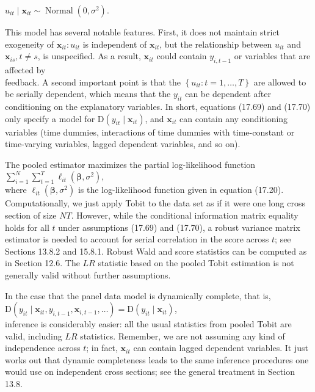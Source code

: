 \documentclass[10pt]{article}
\begin{document}
$u_{i t} \mid \mathbf{x}_{i t} \sim \operatorname{Normal}\left(0, \sigma^{2}\right)$.

This model has several notable features. First, it does not maintain strict exogeneity of $\mathbf{x}_{i t}: u_{i t}$ is independent of $\mathbf{x}_{i t}$, but the relationship between $u_{i t}$ and $\mathbf{x}_{i s}, t \neq s$, is unspecified. As a result, $\mathbf{x}_{i t}$ could contain $y_{i, t-1}$ or variables that are affected by\\
feedback. A second important point is that the $\left\{u_{i t}: t=1, \ldots, T\right\}$ are allowed to be serially dependent, which means that the $y_{i t}$ can be dependent after conditioning on the explanatory variables. In short, equations (17.69) and (17.70) only specify a model for $\mathrm{D}\left(y_{i t} \mid \mathbf{x}_{i t}\right)$, and $\mathbf{x}_{i t}$ can contain any conditioning variables (time dummies, interactions of time dummies with time-constant or time-varying variables, lagged dependent variables, and so on).

The pooled estimator maximizes the partial log-likelihood function\\
$\sum_{i=1}^{N} \sum_{t=1}^{T} \ell_{i t}\left(\boldsymbol{\beta}, \sigma^{2}\right)$,\\
where $\ell_{i t}\left(\boldsymbol{\beta}, \sigma^{2}\right)$ is the log-likelihood function given in equation (17.20). Computationally, we just apply Tobit to the data set as if it were one long cross section of size $N T$. However, while the conditional information matrix equality holds for all $t$ under assumptions (17.69) and (17.70), a robust variance matrix estimator is needed to account for serial correlation in the score across $t$; see Sections 13.8.2 and 15.8.1. Robust Wald and score statistics can be computed as in Section 12.6. The $L R$ statistic based on the pooled Tobit estimation is not generally valid without further assumptions.

In the case that the panel data model is dynamically complete, that is,\\
$\mathrm{D}\left(y_{i t} \mid \mathbf{x}_{i t}, y_{i, t-1}, \mathbf{x}_{i, t-1}, \ldots\right)=\mathrm{D}\left(y_{i t} \mid \mathbf{x}_{i t}\right)$,\\
inference is considerably easier: all the usual statistics from pooled Tobit are valid, including $L R$ statistics. Remember, we are not assuming any kind of independence across $t$; in fact, $\mathbf{x}_{i t}$ can contain lagged dependent variables. It just works out that dynamic completeness leads to the same inference procedures one would use on independent cross sections; see the general treatment in Section 13.8.
\end{document}
